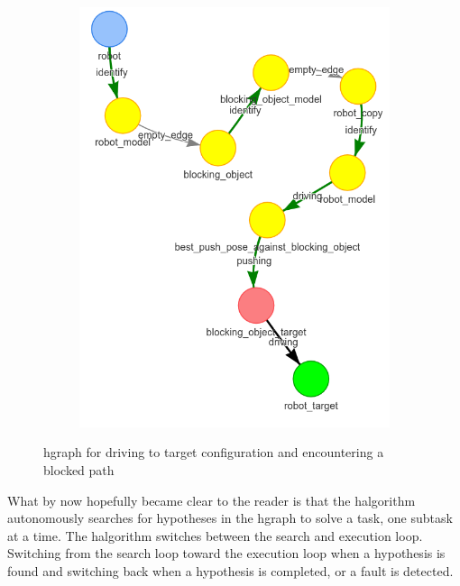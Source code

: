 \begin{figure}[H]
\begin{subfigure}{.3\textwidth}
    \caption{}\label{subfig:blocking_obj_5}
    \end{subfigure}
    \begin{subfigure}{.3\textwidth}
    \centering
    \includegraphics[width=\textwidth]{figures/proposed_method/connecting_nodes/blocking_obj/blocking_obj_6}
    \caption{}\label{subfig:blocking_obj_6}
    \end{subfigure}
    \caption{\ac{hgraph} for driving to target configuration and encountering a blocked path}%
    \label{fig:blocking_obj_hgraph}
\end{figure}

What by now hopefully became clear to the reader is that the \ac{halgorithm} autonomously searches for hypotheses in the \ac{hgraph} to solve a task, one subtask at a time. The \ac{halgorithm} switches between the search and execution loop. Switching from the search loop toward the execution loop when a hypothesis is found and switching back when a hypothesis is completed, or a fault is detected.\bs

